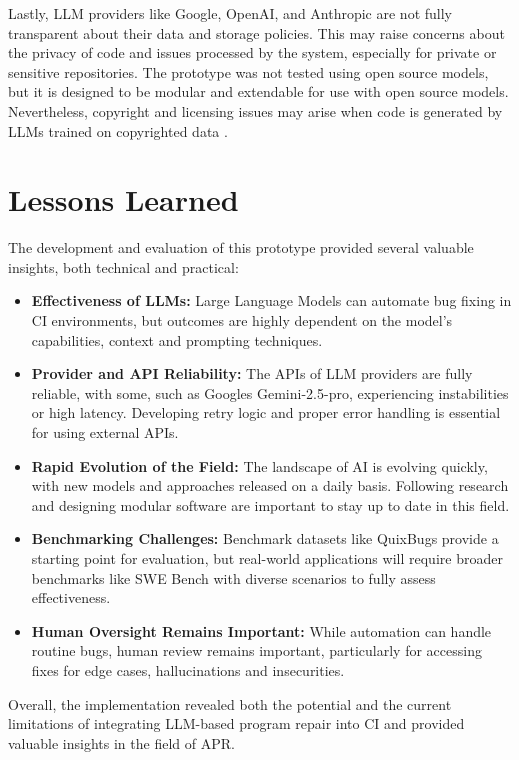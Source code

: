 Lastly, \ac{LLM} providers like Google, OpenAI, and Anthropic are not fully transparent about their data and storage policies. This may raise concerns about the privacy of code and issues processed by the system, especially for private or sensitive repositories. The prototype was not tested using open source models, but it is designed to be modular and extendable for use with open source models. Nevertheless, copyright and licensing issues may arise when code is generated by \acp{LLM} trained on copyrighted data \cite{sauvolaFutureSoftwareDevelopment2024, houLargeLanguageModels2024}.

\section{Lessons Learned}
The development and evaluation of this prototype provided several valuable insights, both technical and practical:

\begin{itemize}
    \item \textbf{Effectiveness of \acp{LLM}:} Large Language Models can automate bug fixing in CI environments, but outcomes are highly dependent on the model's capabilities, context and prompting techniques.
    \item \textbf{Provider and API Reliability:} The APIs of \ac{LLM} providers are fully reliable, with some, such as Googles Gemini-2.5-pro, experiencing instabilities or high latency. Developing retry logic and proper error handling is essential for using external APIs.
    \item \textbf{Rapid Evolution of the Field:} The landscape of \ac{AI} is evolving quickly, with new models and approaches released on a daily basis. Following research and designing modular software are important to stay up to date in this field.
    \item \textbf{Benchmarking Challenges:} Benchmark datasets like QuixBugs provide a starting point for evaluation, but real-world applications will require broader benchmarks like SWE Bench with diverse scenarios to fully assess effectiveness.
    \item \textbf{Human Oversight Remains Important:} While automation can handle routine bugs, human review remains important, particularly for accessing fixes for edge cases, hallucinations and insecurities.
\end{itemize}

Overall, the implementation revealed both the potential and the current limitations of integrating LLM-based program repair into CI and provided valuable insights in the field of \ac{APR}.


